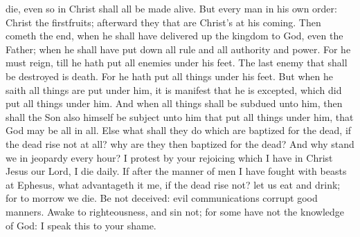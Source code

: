 die, even so in Christ shall all be made alive.  But
every man in his own order: Christ the firstfruits; afterward they that
are Christ's at his coming.  Then cometh the end, when he
shall have delivered up the kingdom to God, even the Father; when he
shall have put down all rule and all authority and power.
 For he must reign, till he hath put all enemies under
his feet.  The last enemy that shall be destroyed is
death.  For he hath put all things under his feet. But
when he saith all things are put under him, it is manifest that he is
excepted, which did put all things under him.  And when
all things shall be subdued unto him, then shall the Son also himself be
subject unto him that put all things under him, that God may be all in
all.  Else what shall they do which are baptized for the
dead, if the dead rise not at all? why are they then baptized for the
dead?  And why stand we in jeopardy every hour?
 I protest by your rejoicing which I have in Christ Jesus
our Lord, I die daily.  If after the manner of men I have
fought with beasts at Ephesus, what advantageth it me, if the dead rise
not? let us eat and drink; for to morrow we die.  Be not
deceived: evil communications corrupt good manners. 
Awake to righteousness, and sin not; for some have not the knowledge of
God: I speak this to your shame.

